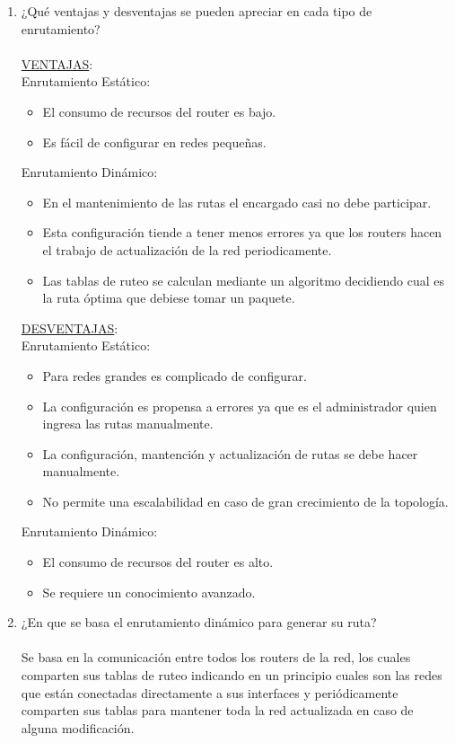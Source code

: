\documentclass{udpreport}
\begin{document}
	\begin{enumerate}
	    \item ¿Qué ventajas y desventajas se pueden apreciar en cada tipo de enrutamiento?\\\\
	    \underline {VENTAJAS}:\\
	    Enrutamiento Estático:
	    \begin{itemize}
	    	\item El consumo de recursos del router es bajo.
	    	\item Es fácil de configurar en redes pequeñas.
	    \end{itemize}
	    Enrutamiento Dinámico:
	    \begin{itemize}
	    	\item En el mantenimiento de las rutas el encargado casi no debe participar.
	    	\item Esta configuración tiende a tener menos errores ya que los routers hacen el trabajo de actualización de la red periodicamente.
	    	\item Las tablas de ruteo se calculan mediante un algoritmo decidiendo cual es la ruta óptima que debiese tomar un paquete.
	    \end{itemize}
	    \underline{DESVENTAJAS}:\\
	    Enrutamiento Estático:
	    \begin{itemize}
	    	\item Para redes grandes es complicado de configurar.
	    	\item La configuración es propensa a errores ya que es el administrador quien ingresa las rutas manualmente.
	    	\item La configuración, mantención y actualización de rutas se debe hacer manualmente.
	    	\item No permite una escalabilidad en caso de gran crecimiento de la topología.
	    \end{itemize}
	    Enrutamiento Dinámico:
	    \begin{itemize}
	    	\item El consumo de recursos del router es alto.
	    	\item Se requiere un conocimiento avanzado.
	    \end{itemize}
            \item ¿En que se basa el enrutamiento dinámico para generar su ruta?\\\\
            	Se basa en la comunicación entre todos los routers de la red, los cuales comparten sus tablas de ruteo indicando en un principio cuales son las redes que están conectadas directamente a sus interfaces y periódicamente comparten sus tablas para mantener toda la red actualizada en caso de alguna modificación.
            	

\end{enumerate}
\end{document}
